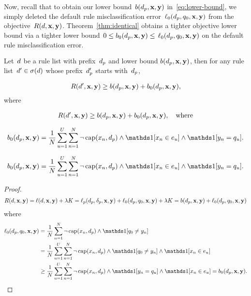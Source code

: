Now, recall that to obtain our lower bound~${b(d_p, \mathbf{x}, \mathbf{y})}$
in~\eqref{eq:lower-bound}, we simply deleted the
default rule misclassification error~$\ell_0(d_p, q_0, \mathbf{x}, \mathbf{y})$
from the objective~${R({d}, \mathbf{x}, \mathbf{y})}$.
%
Theorem~\ref{thm:identical} obtains a tighter objective lower bound
via a tighter lower bound~${0 \le b_0(d_p, \mathbf{x}, \mathbf{y}) \le}$
$\ell_0(d_p, q_0, \mathbf{x}, \mathbf{y})$ on the default rule misclassification error.

\begin{theorem}
\label{thm:identical}
Let~${d}$ be a rule list with prefix~$d_p$
and lower bound ${b(d_p, \mathbf{x}, \mathbf{y})}$,
then for any rule list~${{d}' \in \sigma({d})}$
whose prefix~$d_p'$ starts with~$d_p$,
\begin{arxiv}
\begin{align}
R({d}', \mathbf{x}, \mathbf{y}) \ge b(d_p, \mathbf{x}, \mathbf{y}) + b_0(d_p, \mathbf{x}, \mathbf{y}),
\label{eq:identical}
\end{align}
where
\end{arxiv}
\begin{kdd}
\begin{align}
R({d}', \mathbf{x}, \mathbf{y}) \ge b(d_p, \mathbf{x}, \mathbf{y}) + b_0(d_p, \mathbf{x}, \mathbf{y}), \quad \text{where}
\end{align}
\end{kdd}
\begin{arxiv}
\begin{align}
b_0(\Prefix, \x, \y) = \frac{1}{N} \sum_{u=1}^U \sum_{n=1}^N
    \neg\, \Cap(x_n, \Prefix) \wedge \one [ x_n \in e_u ] \wedge \one [ y_n = q_u ].
\end{align}
\end{arxiv}
\begin{kdd}
\begin{align}
b_0(\Prefix, \x, \y) = \frac{1}{N} \sum_{u=1}^U \sum_{n=1}^N
    \neg\, \Cap(x_n, \Prefix) \wedge \one [ x_n \in e_u ] \wedge \one [ y_n = q_u ]. \nn
\end{align}
\end{kdd}
\end{theorem}

\begin{arxiv}
\begin{proof}
\begin{align}
R({d}, \mathbf{x}, \mathbf{y}) = \ell({d}, \mathbf{x}, \mathbf{y}) + {\lambda} K
= \ell_p(d_p, \delta_p, \mathbf{x}, \mathbf{y}) + \ell_0(d_p, q_0, \mathbf{x}, \mathbf{y}) + {\lambda} K
= b(d_p, \mathbf{x}, \mathbf{y}) + \ell_0(d_p, q_0, \mathbf{x}, \mathbf{y}) \nonumber
\end{align}
where
\begin{align}
\Loss_0(\Prefix, \Default, \x, \y)
&= \frac{1}{N} \sum_{n=1}^N \neg\, \Cap(x_n, \Prefix) \wedge \one [ q_0 \neq y_n ] \nn \\
&= \frac{1}{N} \sum_{u=1}^U \sum_{n=1}^N \neg\, \Cap(x_n, \Prefix) \wedge \one [ q_0 \neq y_n ]
  \wedge \one [ x_n \in e_u ] \nn \\
&\ge \frac{1}{N} \sum_{u=1}^U \sum_{n=1}^N \neg\, \Cap(x_n, \Prefix) \wedge \one [ y_n = q_u ]
  \wedge \one [ x_n \in e_u ] = b_0(\Prefix, \x, \y).
\end{align}
\end{proof}
\end{arxiv}

